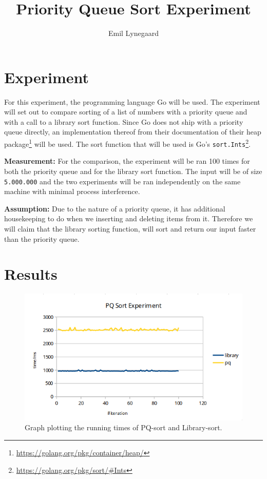 \documentclass[a5paper]{article}
\title{Priority Queue Sort Experiment}
\author{Emil Lynegaard}
\begin{document}
  \maketitle
  \section{Experiment}
  For this experiment, the programming language Go will be used. The experiment will set out to compare sorting of a list of numbers with a priority queue and with a call to a library sort function. Since Go does not ship with a priority queue directly, an implementation thereof from their documentation of their heap package\footnote{\url{https://golang.org/pkg/container/heap/}} will be used. The sort function that will be used is Go's \texttt{sort.Ints}\footnote{\url{https://golang.org/pkg/sort/\#Ints}}.

\textbf{Measurement:} For the comparison, the experiment will be ran 100 times for both the priority queue and for the library sort function. The input will be of size \texttt{5.000.000} and the two experiments will be ran independently on the same machine with minimal process interference.

\textbf{Assumption:} Due to the nature of a priority queue, it has additional housekeeping to do when we inserting and deleting items from it. Therefore we will claim that the library sorting function, will sort and return our input faster than the priority queue.

\section{Results}
\begin{figure}[!ht]
    \centering
    \noindent\includegraphics[scale=0.6]{graph.png}
    \caption{Graph plotting the running times of PQ-sort and Library-sort.\label{fig:graph}}
\end{figure}
\end{document}
